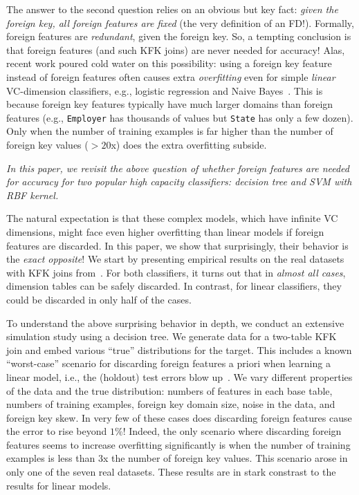 \documentclass[sigconf]{acmart}
\begin{document}
The answer to the second question relies on an obvious but key fact: \textit{given the foreign key, all foreign features are fixed} (the very definition of an FD!).
Formally, foreign features are \textit{redundant}, given the foreign key. 
So, a tempting conclusion is that foreign features (and such KFK joins) are never needed for accuracy! Alas, recent work poured cold water
on this possibility: using a foreign key feature instead of foreign features often causes extra \textit{overfitting} even for simple \textit{linear} VC-dimension classifiers,
e.g., logistic regression and Naive Bayes~\cite{hamlet}. This is because foreign key features typically have much larger domains than foreign features (e.g., 
\texttt{Employer} has thousands of values but \texttt{State} has only a few dozen). 
Only when the number of training examples is far higher than the number of foreign key values ($>20$x) does the extra overfitting subside.

\textit{In this paper, we revisit the above question of whether foreign features are needed for accuracy for two popular \textit{high capacity} classifiers: 
decision tree and SVM with RBF kernel.}

The natural expectation is that these complex models, which have infinite VC dimensions, might face even higher overfitting than linear models if foreign features are 
discarded. In this paper, we show that surprisingly, their behavior is the \textit{exact opposite}! We start by presenting empirical results 
on the real datasets with KFK joins from~\cite{hamlet}. For both classifiers, it turns out that in \textit{almost all cases}, dimension tables can be safely 
discarded. In contrast, for linear classifiers, they could be discarded in only half of the cases.

To understand the above surprising behavior in depth, we conduct an extensive simulation study using a decision tree. We generate data for a two-table KFK join 
and embed various ``true'' distributions for the target. This includes a known ``worst-case'' scenario for discarding foreign features a priori when learning a linear model, 
i.e., the (holdout) test errors blow up~\cite{hamlet}. We vary different properties of the data and the true distribution: 
numbers of features in each base table, numbers of training examples, foreign key domain size, noise in the data, and foreign key skew. 
In very few of these cases does discarding foreign features cause the error to rise beyond $1\%$! Indeed, the only scenario where discarding foreign features seems to increase 
overfitting significantly is when the number of training examples is less than $3$x the number of foreign key values. This scenario arose in only one of the seven real datasets.
These results are in stark constrast to the results for linear models.
\end{document}
